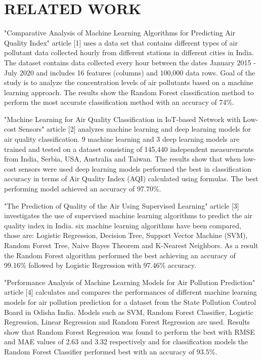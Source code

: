 \documentclass[conference]{IEEEtran}
\begin{document}
\section{RELATED WORK}

"Comparative Analysis of Machine Learning Algorithms for Predicting Air Quality Index" article [1] uses a data set that contains different types of air pollutant data collected hourly from different stations in different cities in India. The dataset contains data collected every hour between the dates January 2015 - July  2020 and includes 16 features (columns) and 100,000 data rows. Goal of the study is to analyze the concentration levels of air pollutants based on a machine learning approach. The results show the Random Forest classification method to perform the most accurate classification method with an accuracy of 74\%.
\vspace{5mm}
\vspace{5mm}

"Machine Learning for Air Quality Classification in IoT-based Network with Low-cost Sensors" article [2] analyzes machine learning and deep learning models for air quality classification. 9 machine learning and 3 deep learning models are trained and tested on a dataset consisting of 145,440 independent measurements from India, Serbia, USA, Australia and Taiwan. The results show that when low-cost sensors were used deep learning models performed the best in classification accuracy in terms of Air Quality Index (AQI) calculated using formulas. The best performing model achieved an accuracy of 97.70\%.
\vspace{5mm}

"The Prediction of Quality of the Air Using Supervised Learning" article [3] investigates the use of supervised machine learning algorithms to predict the air quality index in India. six machine learning algorithms have been compared, those are: Logistic Regression, Decision Tree, Support Vector Machine (SVM), Random Forest Tree, Naive Bayes Theorem and K-Nearest Neighbors. As a result the Random Forest algorithm performed the best achieving an accuracy of 99.16\% followed by Logistic Regression with 97.46\% accuracy.
\vspace{5mm}

"Performance Analysis of Machine Learning Models for Air Pollution Prediction" article [4] calculates and compares the performances of different machine learning models for air pollution prediction for a dataset from the State Pollution Control Board in Odisha India. Models such as SVM, Random Forest Classifier, Logistic Regression, Linear Regression and Random Forest Regression are used. Results show that Random Forest Regression was found to perform the best with RMSE and MAE values of 2.63 and 3.32 respectively and for classification models the Random Forest Classifier performed best with an accuracy of 93.5\%.
\vspace{5mm}
\end{document}
